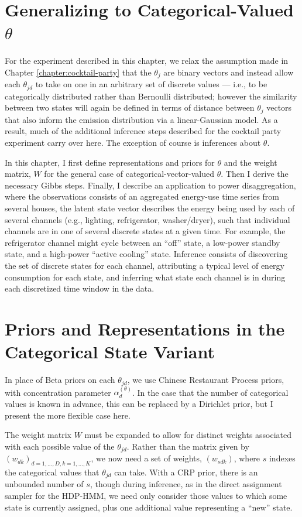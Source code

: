 \section{Generalizing to Categorical-Valued $\theta$}
For the experiment described in this chapter, 
we relax the assumption made in Chapter \ref{chapter:cocktail-party} 
that the $\theta_j$ are binary vectors and
instead allow each $\theta_{jd}$ to take on one in an arbitrary set of
discrete values --- i.e., to be categorically distributed rather than
Bernoulli distributed; however the similarity between two states will again be defined in terms of distance between $\theta_j$ vectors that also inform the emission distribution via a linear-Gaussian model.  As a result, much of the additional inference steps described for the 
cocktail party experiment carry over here.  The exception of course is
inferences about $\theta$.

In this chapter, I first define representations and priors for $\theta$ and the weight matrix, 
$W$ for the general case of categorical-vector-valued $\theta$.  Then I derive the necessary Gibbs steps.  Finally, I describe an application to power disaggregation, where the observations consists of an aggregated energy-use time series from several houses, the latent state vector describes the energy being used by each of several channels (e.g., lighting, refrigerator, washer/dryer), such that individual channels are in one of several discrete states at a given time. For example, the refrigerator channel might cycle between an ``off'' state, a low-power standby state, and a high-power ``active cooling'' state.  Inference consists of discovering the set of discrete states for each channel, attributing a typical level of energy consumption for each state, and inferring what state each channel is in during each discretized time window in the data.

\section{Priors and Representations in the Categorical State Variant}
\label{sec:priors-repr-categ}

In place of Beta priors on each $\theta_{jd}$, we use Chinese
Restaurant Process priors, with concentration parameter
$\alpha_{d}^{(\theta)}$.  In the case that the number of categorical 
values is known in advance, this can be replaced by a Dirichlet 
prior, but I present the more flexible case here. 

The weight matrix $W$ must be expanded to allow for distinct weights
associated with each possible value of the $\theta_{jd}$.  Rather than
the matrix given by $(w_{dk})_{d=1,\dots,D,k=1,\dots,K}$, we now need
a set of weights, $(w_{sdk})$, where $s$ indexes the categorical
values that $\theta_{jd}$ can take.  With a CRP prior, 
there is an unbounded number of $s$, though during inference, as in the direct assignment sampler for the HDP-HMM, we need only consider those values to which some state is currently assigned, plus one additional value representing a ``new'' state.

